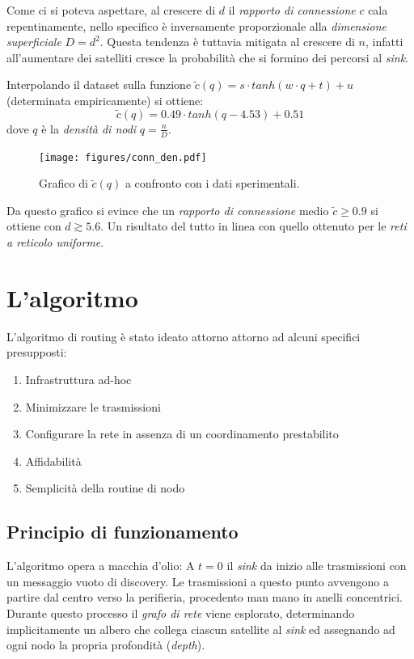 \documentclass[a4paper,12pt]{article}
\theoremstyle{definition}
\begin{document}
Come ci si poteva aspettare, al crescere di $d$ il \emph{rapporto di connessione} $c$ cala repentinamente, nello specifico è inversamente proporzionale alla \emph{dimensione superficiale} $D = d^2$. Questa tendenza è tuttavia mitigata al crescere di $n$, infatti all'aumentare dei satelliti cresce la probabilità che si formino dei percorsi al \emph{sink}.

Interpolando il dataset sulla funzione $\tilde{c}(q) = s \cdot tanh(w \cdot q + t) + u$ (determinata empiricamente) si ottiene:
\begin{equation*}
\tilde{c}(q) = 0.49 \cdot tanh(q - 4.53) + 0.51
\end{equation*}
dove $q$ è la \emph{densità di nodi} $q = \frac{n}{D}$.

\begin{figure}[H]
\centering
\texttt{[image: figures/conn\_den.pdf]}
\caption{Grafico di $\tilde{c}(q)$ a confronto con i dati sperimentali.}
\end{figure}

Da questo grafico si evince che un \emph{rapporto di connessione} medio $\tilde{c} \geq 0.9$ si ottiene con $d \gtrsim 5.6$. Un risultato del tutto in linea con quello ottenuto per le \emph{reti a reticolo uniforme}.

\section{L'algoritmo}

L'algoritmo di routing è stato ideato attorno attorno ad alcuni specifici presupposti:

\begin{enumerate}
\item Infrastruttura ad-hoc
\item Minimizzare le trasmissioni
\item Configurare la rete in assenza di un coordinamento prestabilito
\item Affidabilità
\item Semplicità della routine di nodo
\end{enumerate}

\subsection{Principio di funzionamento}

L'algoritmo opera a macchia d'olio: A $t=0$ il \emph{sink} da inizio alle trasmissioni con un messaggio vuoto di discovery. Le trasmissioni a questo punto avvengono a partire dal centro verso la perifieria, procedento man mano in anelli concentrici. Durante questo processo il \emph{grafo di rete} viene esplorato, determinando implicitamente un albero che collega ciascun satellite al \emph{sink} ed assegnando ad ogni nodo la propria profondità (\emph{depth}).
\end{document}

